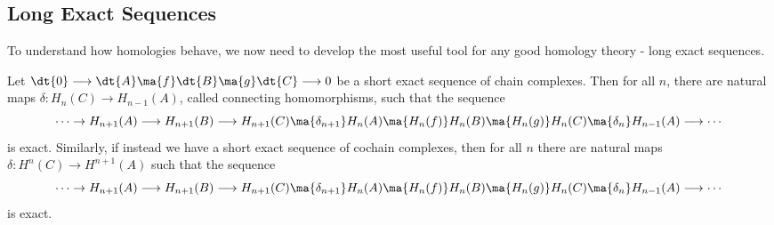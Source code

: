 \subsection{Long Exact Sequences}
















































To understand how homologies behave, we now need to develop the most useful tool for any good homology theory - long exact sequences. 

\begin{thm}
Let $\dt{0} \longrightarrow \dt{A} \ma{f} \dt{B} \ma{g} \dt{C} \longrightarrow 0$ be a short exact sequence of chain complexes. Then for all $n$, there are natural maps $\delta: H_n(C) \rightarrow H_{n-1}(A)$, called connecting homomorphisms, such that the sequence
\[
\cdots \rightarrow H_{n+1}(A) \longrightarrow H_{n+1}(B) \longrightarrow H_{n+1}(C) \ma{\delta_{n+1}} H_n(A) \ma{H_n(f)} H_n(B) \ma{H_n(g)} H_n(C) \ma{\delta_n} H_{n-1}(A) \longrightarrow \cdots
\] 
is exact. Similarly, if instead we have a short exact sequence of cochain complexes, then for all $n$ there are natural maps $\delta: H^n(C) \rightarrow H^{n+1}(A)$ such that the sequence
\[
\cdots \rightarrow H_{n+1}(A) \longrightarrow H_{n+1}(B) \longrightarrow H_{n+1}(C) \ma{\delta_{n+1}} H_n(A) \ma{H_n(f)} H_n(B) \ma{H_n(g)} H_n(C) \ma{\delta_n} H_{n-1}(A) \longrightarrow \cdots
\] 
is exact. 
\end{thm}

